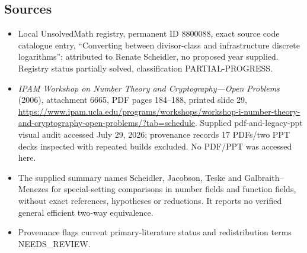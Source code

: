 \documentclass[11pt]{article}
\begin{document}
\subsection{Sources}
\begin{itemize}
\item Local UnsolvedMath registry, permanent ID 8800088, exact source code catalogue entry, ``Converting between divisor-class and infrastructure discrete logarithms''; attributed to Renate Scheidler, no proposed year supplied. Registry status partially solved, classification PARTIAL-PROGRESS.
\item \emph{IPAM Workshop on Number Theory and Cryptography---Open Problems} (2006), attachment 6665, PDF pages 184--188, printed slide 29, \url{https://www.ipam.ucla.edu/programs/workshops/workshop-i-number-theory-and-cryptography-open-problems/?tab=schedule}. Supplied pdf-and-legacy-ppt visual audit accessed July 29, 2026; provenance records 17 PDFs/two PPT decks inspected with repeated builds excluded. No PDF/PPT was accessed here.
\item The supplied summary names Scheidler, Jacobson, Teske and Galbraith--Menezes for special-setting comparisons in number fields and function fields, without exact references, hypotheses or reductions. It reports no verified general efficient two-way equivalence.
\item Provenance flags current primary-literature status and redistribution terms NEEDS\_REVIEW.
\end{itemize}
\end{document}
